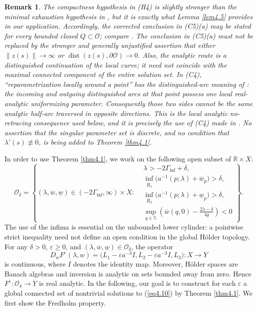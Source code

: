 \documentclass[11pt,reqno]{amsart}
\numberwithin{equation}{section}
\newtheorem{remark}[theorem]{Remark}
\theoremstyle{definition}
\theoremstyle{remark}
\begin{document}
\begin{remark}\label{rem:analytic-global-alternative}
The compactness hypothesis in (H4) is slightly stronger than the
minimal exhaustion hypothesis in \cite[Theorem 6]{ConstantinSV}, but
it is exactly what Lemma \ref{lem4.5} provides in our application.
Accordingly, the corrected conclusion in (C5)(a) may be stated for
every bounded closed $Q\subset\mathcal O$; compare
\cite[Remark 8]{ConstantinSV}.  The conclusion in (C5)(a) must not be replaced
by the stronger and generally unjustified assertion that either
$\|z(s)\|\to\infty$ or
$\operatorname{dist}(z(s),\partial\mathcal O)\to0$.  Also, the
analytic route is a distinguished continuation of the local curve;
it need not coincide with the maximal connected component of the
entire solution set.  In (C4), ``reparametrization locally around a
point'' has the distinguished-arc meaning of
\cite[Theorem 6(C4) and Remark 7]{ConstantinSV}: the incoming and
outgoing distinguished arcs at that point possess one local
real-analytic uniformizing parameter.  Consequently those two sides
cannot be the same analytic half-arc traversed in opposite
directions.  This is the local analytic no-retracing consequence used
below, and it is precisely the use of (C4) made in
\cite[Section 4]{ConstantinSV}.  No assertion that the singular
parameter set is discrete, and no condition that
$\lambda'(s)\not\equiv0$, is being added to Theorem
\ref{thm4.1}.
\end{remark}

In order to use Theorem \ref{thm4.1}, we work on the following
open subset of $\mathbb R\times X$:
\[
\mathcal O_\delta=\left\{
(\lambda,\overline w,\underline w)
\in(-2\Gamma_{\inf},\infty)\times X:
\begin{aligned}
&\lambda>-2\Gamma_{\inf}+\delta,\\
&\inf_{\overline R_1}\bigl(a^{-1}(p;\lambda)+\overline w_p\bigr)>\delta,\\
&\inf_{\overline R_2}\bigl(a^{-1}(p;\lambda)+\underline w_p\bigr)>\delta,\\
&\sup_{q\in\mathbb S}\left(\overline w(q,0)
-\frac{2\lambda-\delta}{4g}\right)<0
\end{aligned}
\right\}.
\]
The use of the infima is essential on the unbounded lower cylinder:
a pointwise strict inequality need not define an open condition in the
global H\"older topology.
For any $\delta>0$, $\varepsilon\geq0$, and
$(\lambda,\overline{w},\underline{w})\in \mathcal{O}_{\delta}$, the
operator
\[
 D_wF^{\varepsilon}(\lambda,w)
 =\bigl(L_1-\varepsilon a^{-3}I,
 L_2-\varepsilon a^{-3}I,L_3\bigr):X\longrightarrow Y
\]
is continuous, where $I$ denotes the identity map. Moreover,
H\"older spaces are Banach algebras and inversion is analytic on
sets bounded away from zero. Hence $F^{\varepsilon}:
\mathcal{O}_{\delta}\rightarrow Y$ is real analytic. In the following, our goal is to
construct for each $\varepsilon$ a global connected set of
nontrivial solutions to (\ref{eq4.10}) by Theorem \ref{thm4.1}. We
first show the Fredholm property.
\end{document}
